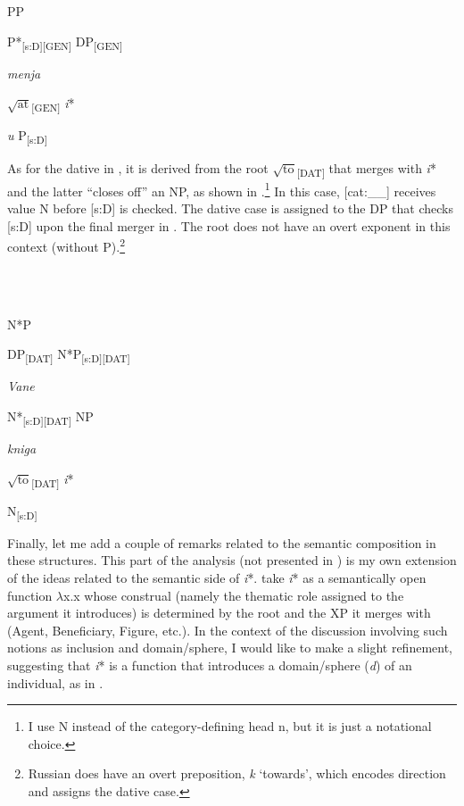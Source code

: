\documentclass[output=paper,colorlinks,citecolor=brown]{./langscibook}
\begin{document}
               PP

  P*\textsubscript{[s:D][GEN]}  DP\textsubscript{[GEN]}  

    \textit{menja}

   $\sqrt{\text{at}}$\textsubscript{[GEN]}  \textit{i}*

  \textit{u}  P\textsubscript{[s:D]}  

As for the dative in , it is derived from the root  $\sqrt{\text{to}}$\textsubscript{[DAT]} that merges with \textit{i}* and the latter “closes off” an NP, as shown in .\footnote{I use N instead of the category-defining head n, but it is just a notational choice.} In this case, [cat:\_\_] receives value N before [s:D] is checked. The dative case is assigned to the DP that checks [s:D] upon the final merger in . The root does not have an overt exponent in this context (without P).\footnote{Russian does have an overt preposition, \textit{k} ‘towards’, which encodes direction and assigns the dative case.}  

\ea%
    \label{ex:tsedryk:18}
    \gll\\
        \\
    \glt
    \z

          N*P

  DP\textsubscript{[DAT]}  N*P\textsubscript{[s:D][DAT]}

  \textit{Vane}

  N*\textsubscript{[s:D][DAT]}  NP

    \textit{kniga}

   $\sqrt{\text{to}}$\textsubscript{[DAT]}  \textit{i}*

    N\textsubscript{[s:D]}

Finally, let me add a couple of remarks related to the semantic composition in these structures. This part of the analysis (not presented in \citealt{TsedrykInPress}) is my own extension of the ideas related to the semantic side of \textit{i}*. \citet{WoodMarantz2017} take \textit{i}* as a semantically open function ${\lambda}$x.x whose construal (namely the thematic role assigned to the argument it introduces) is determined by the root and the XP it merges with (Agent, Beneficiary, Figure, etc.). In the context of the discussion involving such notions as inclusion and domain/sphere, I would like to make a slight refinement, suggesting that \textit{i}* is a function that introduces a domain/sphere (\textit{d}) of an individual, as in . 
\end{document}
